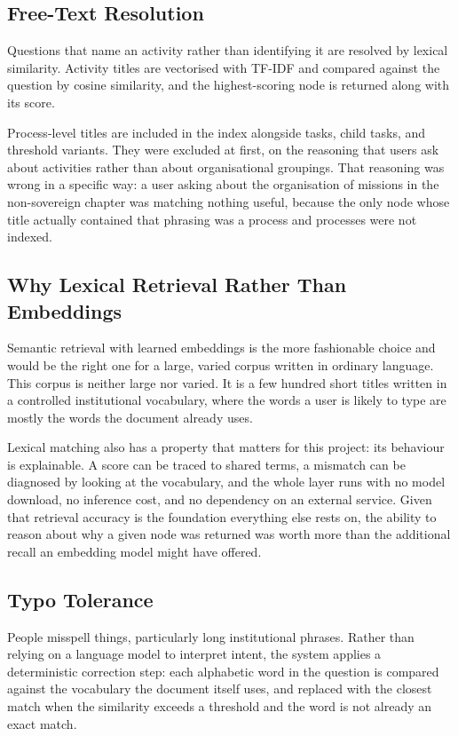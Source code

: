 \subsection{Free-Text Resolution}

Questions that name an activity rather than identifying it are resolved by lexical similarity. Activity titles are vectorised with TF-IDF and compared against the question by cosine similarity, and the highest-scoring node is returned along with its score.

Process-level titles are included in the index alongside tasks, child tasks, and threshold variants. They were excluded at first, on the reasoning that users ask about activities rather than about organisational groupings. That reasoning was wrong in a specific way: a user asking about the organisation of missions in the non-sovereign chapter was matching nothing useful, because the only node whose title actually contained that phrasing was a process and processes were not indexed.

\subsection{Why Lexical Retrieval Rather Than Embeddings}

Semantic retrieval with learned embeddings is the more fashionable choice and would be the right one for a large, varied corpus written in ordinary language. This corpus is neither large nor varied. It is a few hundred short titles written in a controlled institutional vocabulary, where the words a user is likely to type are mostly the words the document already uses.

Lexical matching also has a property that matters for this project: its behaviour is explainable. A score can be traced to shared terms, a mismatch can be diagnosed by looking at the vocabulary, and the whole layer runs with no model download, no inference cost, and no dependency on an external service. Given that retrieval accuracy is the foundation everything else rests on, the ability to reason about why a given node was returned was worth more than the additional recall an embedding model might have offered.

\subsection{Typo Tolerance}

People misspell things, particularly long institutional phrases. Rather than relying on a language model to interpret intent, the system applies a deterministic correction step: each alphabetic word in the question is compared against the vocabulary the document itself uses, and replaced with the closest match when the similarity exceeds a threshold and the word is not already an exact match.

